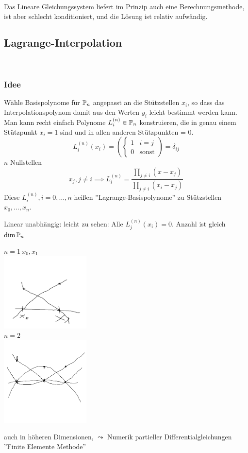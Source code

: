 Das Lineare Gleichungssystem liefert im Prinzip auch eine Berechnungsmethode, ist aber schlecht konditioniert, und die 
Lösung ist relativ aufwändig.

\subsection{Lagrange-Interpolation}\hfill\\
\subsubsection*{Idee} Wähle Basispolynome für $\mathbb{P}_n$ angepasst an die Stützstellen $x_i$, so dass das 
Interpolationspolynom damit aus den Werten $y_i$ leicht bestimmt werden kann. Man kann 
recht einfach Polynome $L_i^{(n)}\in\mathbb{P}_n$ konstruieren, die in genau einem Stützpunkt $x_i = 1$ sind und 
in allen anderen Stützpunkten = 0. $$L_i^{(n)}(x_i) = \left(\begin{cases}
    1& i=j\\ 0& \text{sonst}
\end{cases}\right) = \delta_{ij}$$
 $n$ Nullstellen $$x_j, j\neq i \implies L_i^{(n)} = \frac{\displaystyle\prod_{j\neq i}(x-x_j)}{\displaystyle\prod_{j\neq 
 i}(x_i-x_j)}$$
Diese $L_i^{(n)}, i=0, \dots, n$ heißen ''Lagrange-Basispolynome'' zu Stützstellen $x_0,\dots,x_n$.

Linear unabhängig: leicht zu sehen: Alle $L_j^{(n)}(x_i) = 0$. Anzahl ist gleich $\dim \mathbb{P}_n$

\begin{example} $n=1\  x_0,x_1$ \\
\includegraphics[width=45mm]{../Bilder/x_1_2.png}\\
$n=2$\\
\includegraphics[width=45mm]{../Bilder/x_1_2_3.png}\\
\end{example}
\begin{remark}
auch in höheren Dimensionen, $\leadsto$ Numerik partieller Differentialgleichungen ''Finite Elemente Methode'' \\ 
\end{remark}



